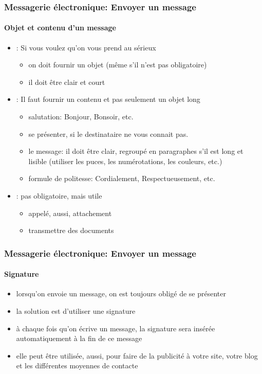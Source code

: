 \documentclass[xcolor=table]{beamer}
\begin{document}
\begin{frame}
\frametitle{Messagerie électronique: Envoyer un message}
\framesubtitle{Objet et contenu d'un message}

\begin{itemize}
	\item {}: Si vous voulez qu'on vous prend au sérieux
	\begin{itemize}
		\item on doit fournir un objet (même s'il n'est pas obligatoire)
		\item il doit être clair et court 
	\end{itemize}
	
	\item {}: Il faut fournir un contenu et pas seulement un objet long 
	\begin{itemize}
		\item salutation: Bonjour, Bonsoir, etc.
		\item se présenter, si le destinataire ne vous connait pas. 
		\item le message: il doit être clair, regroupé en paragraphes s'il est long et lisible (utiliser les puces, les numérotations, les couleurs, etc.)
		\item formule de politesse: Cordialement, Respectueusement, etc.
	\end{itemize}
	
	\item {}: pas obligatoire, mais utile 
	\begin{itemize}
		\item appelé, aussi, attachement
		\item transmettre des documents
	\end{itemize}
	
\end{itemize}

\end{frame}

\begin{frame}
\frametitle{Messagerie électronique: Envoyer un message}
\framesubtitle{Signature}

\begin{itemize}
	\item lorsqu'on envoie un message, on est toujours obligé de se présenter 
	\item la solution est d'utiliser une signature 
	\item à chaque fois qu'on écrive un message, la signature sera insérée automatiquement à la fin de ce message
	\item elle peut être utilisée, aussi, pour faire de la publicité à votre site, votre blog et les différentes moyennes de contacte
\end{itemize}


\end{frame}
\end{document}
